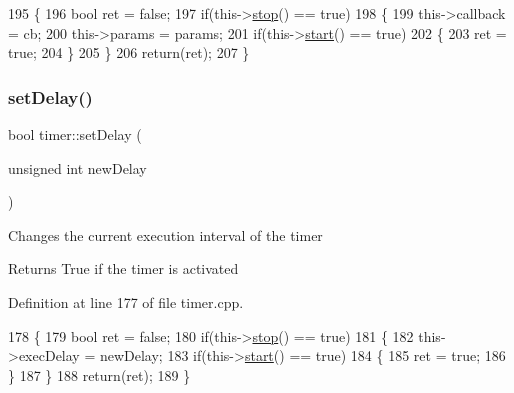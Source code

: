 \begin{DoxyCode}
195 \{
196     \textcolor{keywordtype}{bool} ret = \textcolor{keyword}{false};
197     \textcolor{keywordflow}{if}(this->\hyperlink{classtimer_ad21a0c9113d870f8485b775f1fcd3c73}{stop}() == \textcolor{keyword}{true})
198     \{
199         this->callback = cb;
200         this->params = params;
201         \textcolor{keywordflow}{if}(this->\hyperlink{classtimer_adad85b4705278d4cb8a2a4f3286cc2c7}{start}() == \textcolor{keyword}{true})
202         \{
203             ret = \textcolor{keyword}{true};
204         \}
205     \}
206     \textcolor{keywordflow}{return}(ret);
207 \}
\end{DoxyCode}
\mbox{\label{classtimer_acd8ddd948bf96185cf3c1e0a4cf60264}} 
\subsubsection{\texorpdfstring{set\+Delay()}{setDelay()}}
{\footnotesize\ttfamily bool timer\+::set\+Delay (\begin{DoxyParamCaption}\item[{unsigned int}]{new\+Delay }\end{DoxyParamCaption})}

Changes the current execution interval of the timer \begin{DoxyReturn}{Returns}
True if the timer is activated 
\end{DoxyReturn}


Definition at line 177 of file timer.\+cpp.


\begin{DoxyCode}
178 \{
179     \textcolor{keywordtype}{bool} ret = \textcolor{keyword}{false};
180     \textcolor{keywordflow}{if}(this->\hyperlink{classtimer_ad21a0c9113d870f8485b775f1fcd3c73}{stop}() == \textcolor{keyword}{true})
181     \{
182         this->execDelay = newDelay;
183         \textcolor{keywordflow}{if}(this->\hyperlink{classtimer_adad85b4705278d4cb8a2a4f3286cc2c7}{start}() == \textcolor{keyword}{true})
184         \{
185             ret = \textcolor{keyword}{true};
186         \}
187     \}
188     \textcolor{keywordflow}{return}(ret);
189 \}
\end{DoxyCode}
\mbox{\label{classtimer_ae3dce84bbcd9a7022a20e2b63174aa61}} 
